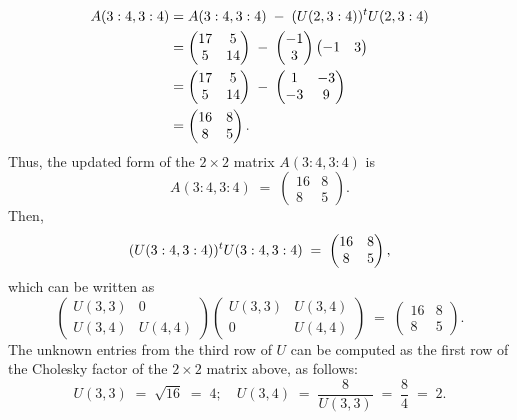 \begin{align*}
A(3:4,3:4)
&= A(3:4,3:4) \;-\; (U(2,3:4))^{t} U(2,3:4) \\
&= \begin{pmatrix} 17 & 5 \\ 5 & 14 \end{pmatrix} \;-\;
\begin{pmatrix} -1 \\ 3 \end{pmatrix} \begin{pmatrix} -1 & 3 \end{pmatrix} \\
&= \begin{pmatrix} 17 & 5 \\ 5 & 14 \end{pmatrix} \;-\;
\begin{pmatrix} 1 & -3 \\ -3 & 9 \end{pmatrix} \\
&= \begin{pmatrix} 16 & 8 \\ 8 & 5 \end{pmatrix}.
\end{align*}
Thus, the updated form of the $2 \times 2$ matrix $A(3:4,3:4)$ is
\begin{equation}
A(3:4,3:4) \;=\; \begin{pmatrix} 16 & 8 \\ 8 & 5 \end{pmatrix}.
\end{equation}
Then,
\[
(U(3:4,3:4))^{t} U(3:4,3:4) \;=\; \begin{pmatrix} 16 & 8 \\ 8 & 5 \end{pmatrix},
\]
which can be written as
\[
\begin{pmatrix} U(3,3) & 0 \\ U(3,4) & U(4,4) \end{pmatrix}
\begin{pmatrix} U(3,3) & U(3,4) \\ 0 & U(4,4) \end{pmatrix}
\;=\; \begin{pmatrix} 16 & 8 \\ 8 & 5 \end{pmatrix}.
\]
The unknown entries from the third row of $U$ can be computed as the first row of
the Cholesky factor of the $2 \times 2$ matrix above, as follows:
\[
U(3,3) \;=\; \sqrt{16} \;=\; 4; \quad U(3,4) \;=\; \frac{8}{U(3,3)} \;=\; \frac{8}{4} \;=\; 2.
\]


